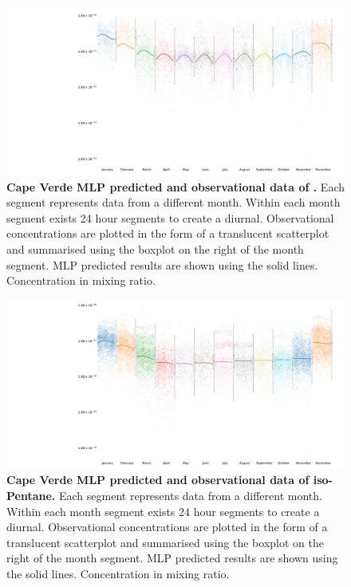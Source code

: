 \begin{figure}[H]
     \centering
         \includegraphics[width=.90\textheight,angle =90,trim={8cm 0 0 0}]{figures_c3/mlpregressor/CVNOX_CapeVerde/NO2.pdf}
        \caption{\textbf{Cape Verde MLP predicted and observational data of .} Each segment represents data from a different month. Within each month segment exists 24 hour segments to create a diurnal. Observational concentrations are plotted in the form of a translucent scatterplot and summarised using the boxplot on the right of the month segment. MLP predicted results are shown using the solid lines. Concentration in mixing ratio.}
        \label{fig:mlpno2}
\end{figure}

\begin{figure}[H]
     \centering
         \includegraphics[width=.90\textheight,angle =90,trim={8cm 0 0 0}]{figures_c3/mlpregressor/CVNOX_CapeVerde/ISO_PENTANE.pdf}
        \caption{\textbf{Cape Verde MLP predicted and observational data of iso-Pentane.} Each segment represents data from a different month. Within each month segment exists 24 hour segments to create a diurnal. Observational concentrations are plotted in the form of a translucent scatterplot and summarised using the boxplot on the right of the month segment. MLP predicted results are shown using the solid lines. Concentration in mixing ratio. }
        \label{fig:mlpisopentane}
\end{figure}


